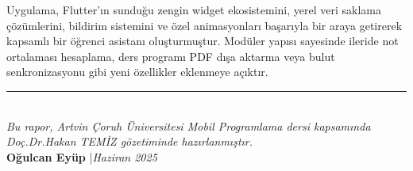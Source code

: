 \documentclass[12pt,a4paper]{article}
\begin{document}
Uygulama, Flutter'ın sunduğu zengin widget ekosistemini, yerel veri saklama çözümlerini, bildirim sistemini ve özel animasyonları başarıyla bir araya getirerek kapsamlı bir öğrenci asistanı oluşturmuştur. Modüler yapısı sayesinde ileride not ortalaması hesaplama, ders programı PDF dışa aktarma veya bulut senkronizasyonu gibi yeni özellikler eklenmeye açıktır.

\vspace{1.5cm}
\begin{center}
    \color{gri}\rule{0.5\textwidth}{0.4pt}\\[0.5cm]
    \textit{Bu rapor, Artvin Çoruh Üniversitesi Mobil Programlama dersi kapsamında}\\[0.2cm]
    \textit{Doç.\@ Dr.\@ Hakan TEMİZ gözetiminde hazırlanmıştır.}\\[0.5cm]
    \textbf{Oğulcan Eyüp} \quad|\quad \textit{Haziran 2025}
\end{center}
\end{document}
